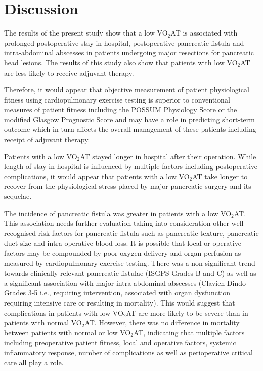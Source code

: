 \clearpage

\section{Discussion}
The results of the present study show that a low VO$_2$AT is associated with prolonged postoperative stay in hospital, postoperative pancreatic fistula and intra-abdominal abscesses in patients undergoing major resections for pancreatic head lesions. The results of this study also show that patients with low VO$_2$AT are less likely to receive adjuvant therapy. 

Therefore, it would appear that objective measurement of patient physiological fitness using cardiopulmonary exercise testing is superior to conventional measures of patient fitness including the POSSUM Physiology Score or the modified Glasgow Prognostic Score and may have a role in predicting short-term outcome which in turn affects the overall management of these patients including receipt of adjuvant therapy.

Patients with a low VO$_2$AT stayed longer in hospital after their operation. While length of stay in hospital is influenced by multiple factors including postoperative complications, it would appear that patients with a low VO$_2$AT take longer to recover from the physiological stress placed by major pancreatic surgery and its sequelae.

The incidence of pancreatic fistula was greater in patients with a low VO$_2$AT. This association needs further evaluation taking into consideration other well-recognised risk factors for pancreatic fistula such as pancreatic texture, pancreatic duct size and intra-operative blood loss.\parencite{braga_prognostic_2011, pratt_possum_2008, winter_1423_2006} It is possible that local or operative factors may be compounded by poor oxygen delivery and organ perfusion as measured by cardiopulmonary exercise testing. There was a non-significant trend towards clinically relevant pancreatic fistulae (ISGPS Grades B and C) as well as a significant association with major intra-abdominal abscesses (Clavien-Dindo Grades 3-5 i.e., requiring intervention, associated with organ dysfunction requiring intensive care or resulting in mortality). This would suggest that complications in patients with low VO$_2$AT are more likely to be severe than in patients with normal VO$_2$AT. However, there was no difference in mortality between patients with normal or low VO$_2$AT, indicating that multiple factors including preoperative patient fitness, local and operative factors, systemic inflammatory response, number of complications as well as perioperative critical care all play a role.


